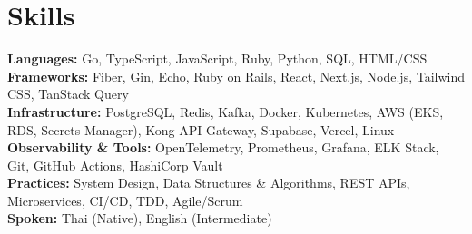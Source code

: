 \documentclass[10pt]{article}
\begin{document}
\section*{Skills}

\textbf{Languages:} Go, TypeScript, JavaScript, Ruby, Python, SQL, HTML/CSS\\[2pt]
\textbf{Frameworks:} Fiber, Gin, Echo, Ruby on Rails, React, Next.js, Node.js, Tailwind CSS, TanStack Query\\[2pt]
\textbf{Infrastructure:} PostgreSQL, Redis, Kafka, Docker, Kubernetes, AWS (EKS, RDS, Secrets Manager), Kong API Gateway, Supabase, Vercel, Linux\\[2pt]
\textbf{Observability \& Tools:} OpenTelemetry, Prometheus, Grafana, ELK Stack, Git, GitHub Actions, HashiCorp Vault\\[2pt]
\textbf{Practices:} System Design, Data Structures \& Algorithms, REST APIs, Microservices, CI/CD, TDD, Agile/Scrum\\[2pt]
\textbf{Spoken:} Thai (Native), English (Intermediate)
\end{document}
